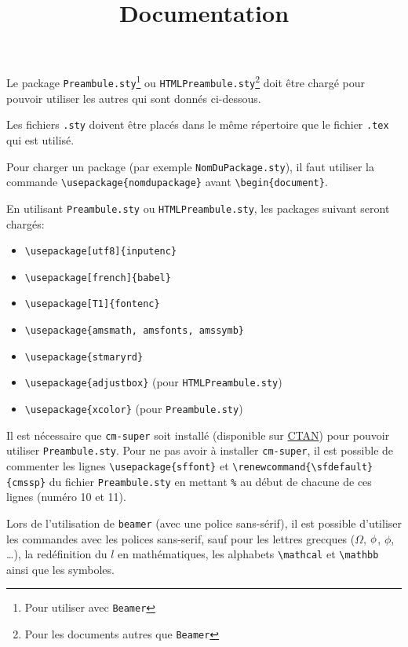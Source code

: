 \documentclass[a4paper,12pt]{article}
\title{Documentation}
\author{}
\date{}
\begin{document}
\maketitle
Le package \texttt{Preambule.sty}\footnote{Pour utiliser avec \Verb?Beamer?} ou \texttt{HTMLPreambule.sty}\footnote{Pour les documents autres que \Verb?Beamer?} doit être chargé pour pouvoir utiliser les autres qui sont donnés ci-dessous.

Les fichiers \Verb?.sty? doivent être placés dans le même répertoire que le fichier \Verb?.tex? qui est utilisé.

Pour charger un package (par exemple \Verb?NomDuPackage.sty?), il faut utiliser la commande \Verb?\usepackage{nomdupackage}? avant \Verb?\begin{document}?.

\vspace{0.5cm}

En utilisant \texttt{Preambule.sty} ou \texttt{HTMLPreambule.sty}, les packages suivant seront chargés:
\begin{itemize}
    \renewcommand{\labelitemi}{$\to$}
    \item \Verb?\usepackage[utf8]{inputenc}?
    \item \Verb?\usepackage[french]{babel}?
    \item \Verb?\usepackage[T1]{fontenc}?
    \item \Verb?\usepackage{amsmath, amsfonts, amssymb}?
    \item \Verb?\usepackage{stmaryrd}?
    \item \Verb?\usepackage{adjustbox}? (pour \texttt{HTMLPreambule.sty})
    \item \Verb?\usepackage{xcolor}? (pour \texttt{Preambule.sty})
\end{itemize}

\vspace{0.5cm}
Il est nécessaire que \texttt{cm-super} soit installé (disponible sur \href{https://ctan.org/pkg/cm-super}{CTAN}) pour pouvoir utiliser \texttt{Preambule.sty}. Pour ne pas avoir à installer \texttt{cm-super}, il est possible de commenter les lignes \Verb?\usepackage{sffont}? et \Verb?\renewcommand{\sfdefault}{cmssp}? du fichier \texttt{Preambule.sty} en mettant \Verb?%

Lors de l'utilisation de \texttt{beamer} (avec une police sans-sérif), il est possible d'utiliser les commandes avec les polices sans-serif, sauf pour les lettres grecques ($\Omega$, $\phi$, $\phi$, \dots), la redéfinition du $l$ en mathématiques, les alphabets \Verb?\mathcal? et \Verb?\mathbb? ainsi que les symboles.


\end{document}
\end{document}
